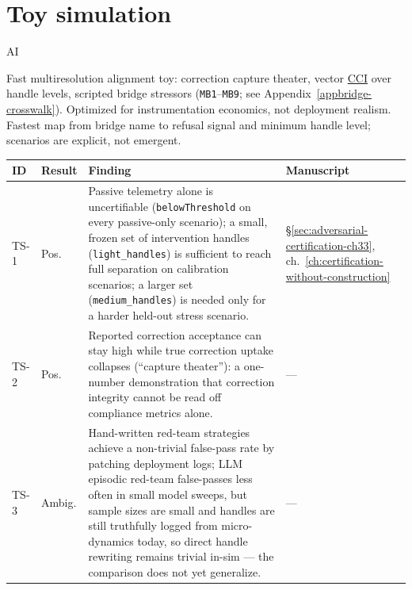 \section{Toy simulation}
\label{sec:appn-toy-simulation}
\begin{authbar}{AI}

Fast multiresolution alignment toy: correction capture theater, vector \hyperref[gloss:cci]{CCI} over handle levels, scripted bridge stressors (\texttt{MB1}--\texttt{MB9}; see Appendix~\ref{appbridge-crosswalk}). Optimized for instrumentation economics, not deployment realism. Fastest map from bridge name to refusal signal and minimum handle level; scenarios are explicit, not emergent.

\small
\setlength{\tabcolsep}{3pt}
\renewcommand{\arraystretch}{1.2}
\end{authbar}
\begin{longtable}{@{}L{0.05\textwidth}L{0.08\textwidth}L{0.55\textwidth}L{0.255\textwidth}@{}}
\toprule
\textbf{ID} & \textbf{Result} & \textbf{Finding} & \textbf{Manuscript} \\
\midrule
\endhead
\bottomrule
\endfoot
\label{finding:ts-1}TS-1 & Pos. & Passive telemetry alone is uncertifiable (\texttt{belowThreshold} on every passive-only scenario); a small, frozen set of intervention handles (\texttt{light\_handles}) is sufficient to reach full separation on calibration scenarios; a larger set (\texttt{medium\_handles}) is needed only for a harder held-out stress scenario. & \S\ref{sec:adversarial-certification-ch33}, ch.~\ref{ch:certification-without-construction} \\
\label{finding:ts-2}TS-2 & Pos. & Reported correction acceptance can stay high while true correction uptake collapses (``capture theater''): a one-number demonstration that correction integrity cannot be read off compliance metrics alone. & --- \\
\label{finding:ts-3}TS-3 & Ambig. & Hand-written red-team strategies achieve a non-trivial false-pass rate by patching deployment logs; LLM episodic red-team false-passes less often in small model sweeps, but sample sizes are small and handles are still truthfully logged from micro-dynamics today, so direct handle rewriting remains trivial in-sim --- the comparison does not yet generalize. & --- \\
\end{longtable}
\normalsize
\renewcommand{\arraystretch}{1.0}

\authbarneedspace
